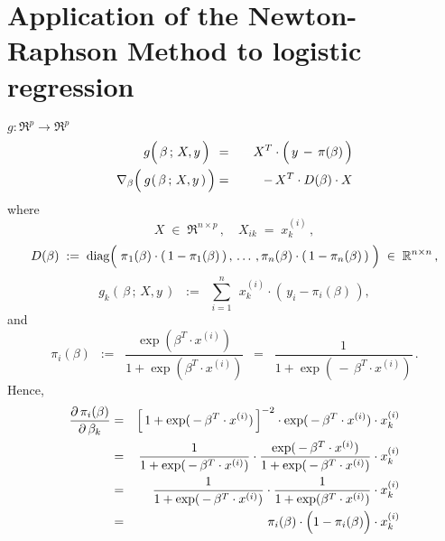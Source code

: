 

\section{Application of the Newton-Raphson Method to logistic regression}
\setcounter{theorem}{0}
\setcounter{equation}{0}

\renewcommand{\theenumi}{\roman{enumi}}
\renewcommand{\labelenumi}{\textnormal{(\theenumi)}$\;\;$}



$g : \Re^{p} \longrightarrow \Re^{p}$
\begin{eqnarray*}
g\!\left(\,\overset{{\color{white}.}}{\beta}\,;\,X,y\,\right){\color{white}.}
& = &
	{\color{white}-}\, X^{T} \cdot \left(\,y \,\overset{{\color{white}.}}{-}\, \pi(\beta)\,\right)
\\
\nabla_{\beta}\!\left(\,\overset{{\color{white}-}}{g}(\,\beta\,;\,X,y\,)\,\right)
& = &
	-\, X^{T} \cdot D(\beta) \cdot X
\end{eqnarray*}
where
\begin{equation*}
X \;\in\; \Re^{n \times p}\,,
\quad
X_{ik} \; = \; x^{(i)}_{k}\,,
\end{equation*}
\begin{equation*}
D(\beta) \; := \; \diag\!\left(\;
	\overset{{\color{white}-}}{\pi}_{1}(\beta) \cdot (\,1-\pi_{1}(\beta)\,)\,,
	\,\ldots\,,
	\pi_{n}(\beta) \cdot (\,1-\pi_{n}(\beta)\,)
	\;\right)
	\;\in\;
	\Re^{n \times n}\,,
\end{equation*}
\begin{equation*}
g_{k}(\,\beta\,;\,X,y\,)
\;\; := \;\;
	\overset{n}{\underset{i=1}{\sum}}\;\, x^{(i)}_{k} \cdot \left(\,y_{i} - \pi_{i}(\beta)\,\right),
\end{equation*}
and
\begin{equation*}
\pi_{i}(\beta)
\;\ := \;\;
	\dfrac{\exp(\beta^{T} \cdot x^{(i)})}{1+\exp(\beta^{T}\cdot x^{(i)})}
\;\ = \;\;
	\dfrac{1}{1+\exp(\,-\,\beta^{T}\cdot x^{(i)})}\,.
\end{equation*}
Hence,
\begin{eqnarray*}
\dfrac{\partial\,\pi_{i}(\beta)}{\partial\,\beta_{k}}
&=&
	\left[\,1+\exp(\,-\,\beta^{T}\cdot x^{(i)})\,\right]^{-2}
	\cdot
	\exp(\,-\,\beta^{T}\cdot x^{(i)})
	\cdot
	x^{(i)}_{k}
\\
&=&
	\dfrac{1}{1+\exp(\,-\,\beta^{T}\cdot x^{(i)})}
	\cdot
	\dfrac{\exp(\,-\,\beta^{T}\cdot x^{(i)})}{1+\exp(\,-\,\beta^{T}\cdot x^{(i)})}
	\cdot
	x^{(i)}_{k}
\\
&=&
	\dfrac{1}{1+\exp(\,-\,\beta^{T}\cdot x^{(i)})}
	\cdot
	\dfrac{1}{1+\exp(\beta^{T}\cdot x^{(i)})}
	\cdot
	x^{(i)}_{k}
\\
&=&
	\pi_{i}(\beta)
	\cdot
	\left(1\overset{{\color{white}.}}{-}\pi_{i}(\beta)\right)
	\cdot
	x^{(i)}_{k}
\end{eqnarray*}

